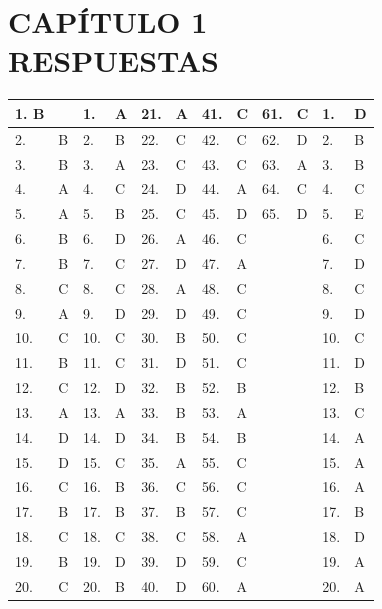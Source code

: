 \documentclass[10pt]{article}
\begin{document}
\section*{CAPÍTULO 1 \\
 RESPUESTAS}
\begin{center}
\begin{tabular}{|l|l|l|l|l|l|l|l|l|l|l|l|}
\hline
1. B &  & 1. & A & 21. & A & 41. & C & 61. & C & 1. & D \\
\hline
2. & B & 2. & B & 22. & C & 42. & C & 62. & D & 2. & B \\
\hline
3. & B & 3. & A & 23. & C & 43. & C & 63. & A & 3. & B \\
\hline
4. & A & 4. & C & 24. & D & 44. & A & 64. & C & 4. & C \\
\hline
5. & A & 5. & B & 25. & C & 45. & D & 65. & D & 5. & E \\
\hline
6. & B & 6. & D & 26. & A & 46. & C &  &  & 6. & C \\
\hline
7. & B & 7. & C & 27. & D & 47. & A &  &  & 7. & D \\
\hline
8. & C & 8. & C & 28. & A & 48. & C &  &  & 8. & C \\
\hline
9. & A & 9. & D & 29. & D & 49. & C &  &  & 9. & D \\
\hline
10. & C & 10. & C & 30. & B & 50. & C &  &  & 10. & C \\
\hline
11. & B & 11. & C & 31. & D & 51. & C &  &  & 11. & D \\
\hline
12. & C & 12. & D & 32. & B & 52. & B &  &  & 12. & B \\
\hline
13. & A & 13. & A & 33. & B & 53. & A &  &  & 13. & C \\
\hline
14. & D & 14. & D & 34. & B & 54. & B &  &  & 14. & A \\
\hline
15. & D & 15. & C & 35. & A & 55. & C &  &  & 15. & A \\
\hline
16. & C & 16. & B & 36. & C & 56. & C &  &  & 16. & A \\
\hline
17. & B & 17. & B & 37. & B & 57. & C &  &  & 17. & B \\
\hline
18. & C & 18. & C & 38. & C & 58. & A &  &  & 18. & D \\
\hline
19. & B & 19. & D & 39. & D & 59. & C &  &  & 19. & A \\
\hline
20. & C & 20. & B & 40. & D & 60. & A &  &  & 20. & A \\
\hline
\end{tabular}
\end{center}
\end{document}
